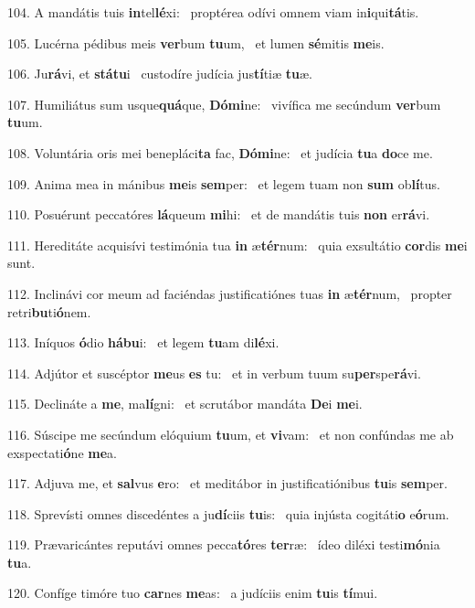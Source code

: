 104. A mandátis tuis \textbf{in}tel\textbf{lé}xi: \ast\  proptérea odívi omnem viam in\textbf{i}qui\textbf{tá}tis.\

105. Lucérna pédibus meis \textbf{ver}bum \textbf{tu}um, \ast\  et lumen \textbf{sé}mitis \textbf{me}is.\

106. Ju\textbf{rá}vi, et \textbf{stá}\textbf{tu}i \ast\  custodíre judícia jus\textbf{tí}tiæ \textbf{tu}æ.\

107. Humiliátus sum usque\textbf{quá}que, \textbf{Dó}\textbf{mi}ne: \ast\  vivífica me secúndum \textbf{ver}bum \textbf{tu}um.\

108. Voluntária oris mei benepláci\textbf{ta} fac, \textbf{Dó}\textbf{mi}ne: \ast\  et judícia \textbf{tu}a \textbf{do}ce me.\

109. Anima mea in mánibus \textbf{me}is \textbf{sem}per: \ast\  et legem tuam non \textbf{sum} ob\textbf{lí}tus.\

110. Posuérunt peccatóres \textbf{lá}queum \textbf{mi}hi: \ast\  et de mandátis tuis \textbf{non} er\textbf{rá}vi.\

111. Hereditáte acquisívi testimónia tua \textbf{in} æ\textbf{tér}num: \ast\  quia exsultátio \textbf{cor}dis \textbf{me}i sunt.\

112. Inclinávi cor meum ad faciéndas justificatiónes tuas \textbf{in} æ\textbf{tér}num, \ast\  propter retri\textbf{bu}ti\textbf{ó}nem.\

113. Iníquos \textbf{ó}dio \textbf{há}\textbf{bu}i: \ast\  et legem \textbf{tu}am di\textbf{lé}xi.\

114. Adjútor et suscéptor \textbf{me}us \textbf{es} tu: \ast\  et in verbum tuum su\textbf{per}spe\textbf{rá}vi.\

115. Declináte a \textbf{me}, ma\textbf{lí}gni: \ast\  et scrutábor mandáta \textbf{De}i \textbf{me}i.\

116. Súscipe me secúndum elóquium \textbf{tu}um, et \textbf{vi}vam: \ast\  et non confúndas me ab exspectati\textbf{ó}ne \textbf{me}a.\

117. Adjuva me, et \textbf{sal}vus \textbf{e}ro: \ast\  et meditábor in justificatiónibus \textbf{tu}is \textbf{sem}per.\

118. Sprevísti omnes discedéntes a ju\textbf{dí}ciis \textbf{tu}is: \ast\  quia injústa cogitáti\textbf{o} e\textbf{ó}rum.\

119. Prævaricántes reputávi omnes pecca\textbf{tó}res \textbf{ter}ræ: \ast\  ídeo diléxi testi\textbf{mó}nia \textbf{tu}a.\

120. Confíge timóre tuo \textbf{car}nes \textbf{me}as: \ast\  a judíciis enim \textbf{tu}is \textbf{tí}mui.\


